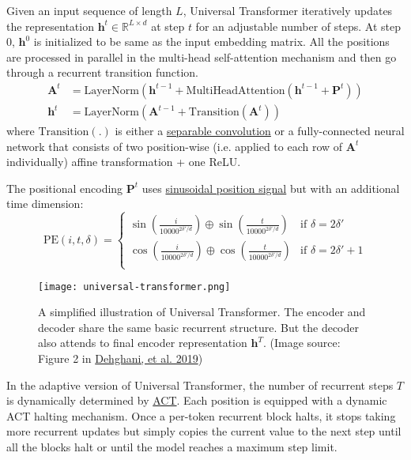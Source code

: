 \documentclass[12pt]{article}
\begin{document}
Given an input sequence of length $L$, Universal Transformer iteratively updates the representation $\mathbf{h}^t \in \mathbb{R}^{L \times d}$ at step $t$ for an adjustable number of steps. At step 0, $\mathbf{h}^0$ is initialized to be same as the input embedding matrix. All the positions are processed in parallel in the multi-head self-attention mechanism and then go through a recurrent transition function.
\[
\begin{aligned}
\mathbf{A}^t &= \text{LayerNorm}(\mathbf{h}^{t-1} + \text{MultiHeadAttention}(\mathbf{h}^{t-1} + \mathbf{P}^t)) \\
\mathbf{h}^t &= \text{LayerNorm}(\mathbf{A}^{t-1} + \text{Transition}(\mathbf{A}^t))
\end{aligned}
\]
where $\text{Transition}(.)$ is either a \href{https://arxiv.org/abs/1610.02357}{separable convolution} or a fully-connected neural network that consists of two position-wise (i.e. applied to each row of $\mathbf{A}^t$ individually) affine transformation + one ReLU.

The positional encoding $\mathbf{P}^t$ uses \href{#sinusoidal-positional-encoding}{sinusoidal position signal} but with an additional time dimension:
\[
\text{PE}(i, t, \delta) = 
\begin{cases}
\sin(\frac{i}{10000^{2\delta'/d}}) \oplus \sin(\frac{t}{10000^{2\delta'/d}}) & \text{if } \delta = 2\delta'\\
\cos(\frac{i}{10000^{2\delta'/d}}) \oplus \cos(\frac{t}{10000^{2\delta'/d}}) & \text{if } \delta = 2\delta' + 1\\
\end{cases}
\]

\begin{figure}[h!]
    \centering
    \texttt{[image: universal-transformer.png]}
    \caption{A simplified illustration of Universal Transformer. The encoder and decoder share the same basic recurrent structure. But the decoder also attends to final encoder representation $\mathbf{h}^T$. (Image source: Figure 2 in \href{https://arxiv.org/abs/1807.03819}{Dehghani, et al. 2019})}
\end{figure}

In the adaptive version of Universal Transformer, the number of recurrent steps $T$ is dynamically determined by \href{https://lilianweng.github.io/posts/2020-04-07-the-transformer-family/#adaptive-computation-time-act}{ACT}. Each position is equipped with a dynamic ACT halting mechanism. Once a per-token recurrent block halts, it stops taking more recurrent updates but simply copies the current value to the next step until all the blocks halt or until the model reaches a maximum step limit.
\end{document}

